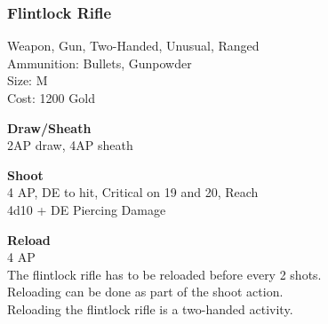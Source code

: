 \subsubsection{Flintlock Rifle}\label{weapon:flintlockRifle}
Weapon, Gun, Two-Handed, Unusual, Ranged\\
Ammunition: Bullets, Gunpowder\\
Size: M\\
Cost: 1200 Gold

\textbf{Draw/Sheath} \\
2AP draw, 4AP sheath

\textbf{Shoot} \\
4 AP, DE to hit, Critical on 19 and 20,  Reach\\
4d10 + DE Piercing Damage

\textbf{Reload} \\
4 AP\\
The flintlock rifle has to be reloaded before every 2 shots.\\
Reloading can be done as part of the shoot action.\\
Reloading the flintlock rifle is a two-handed activity.
